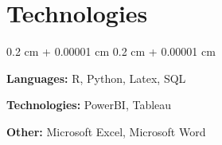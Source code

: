\documentclass[10pt, letterpaper]{article}
\newenvironment{onecolentry}{
    \begin{adjustwidth}{
        0.2 cm + 0.00001 cm
    }{
        0.2 cm + 0.00001 cm
    }
}{
    \end{adjustwidth}
} %
\begin{document}
    
    \section{Technologies}

        
        \begin{onecolentry}
            \textbf{Languages:} R, Python, Latex, SQL
            
            \vspace{0.2 cm}
            
            \textbf{Technologies:} PowerBI, Tableau

            \vspace{0.2 cm}
            
            \textbf{Other:} Microsoft Excel, Microsoft Word
        \end{onecolentry}
\end{document}
